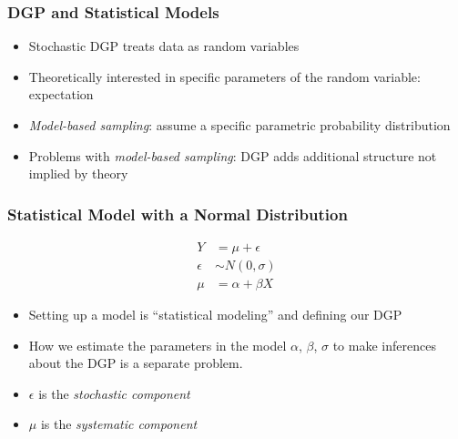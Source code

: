 \documentclass{beamer}
\begin{document}
\begin{frame}
  \frametitle{DGP and Statistical Models}

  \begin{itemize}
  \item Stochastic DGP treats data as random variables
  \item Theoretically interested in specific parameters of the random variable: expectation
  \item \textit{Model-based sampling}: assume a specific parametric probability distribution
  \item Problems with \textit{model-based sampling}: DGP adds additional structure not implied by theory
  \end{itemize}
  
\end{frame}

\begin{frame}
  \frametitle{Statistical Model with a Normal Distribution }
  
  \begin{align*}
    Y &= \mu + \epsilon \\
    \epsilon & \sim N(0, \sigma) \\
    \mu &= \alpha + \beta X
  \end{align*}

  \begin{itemize}
  \item Setting up a model is ``statistical modeling'' and defining our DGP
  \item How we estimate the parameters in the model $\alpha$, $\beta$, $\sigma$ to 
    make inferences about the DGP is a separate problem.
  \item $\epsilon$ is the \textit{stochastic component}
  \item $\mu$ is the \textit{systematic component}
  \end{itemize}

\end{frame}
\end{document}
